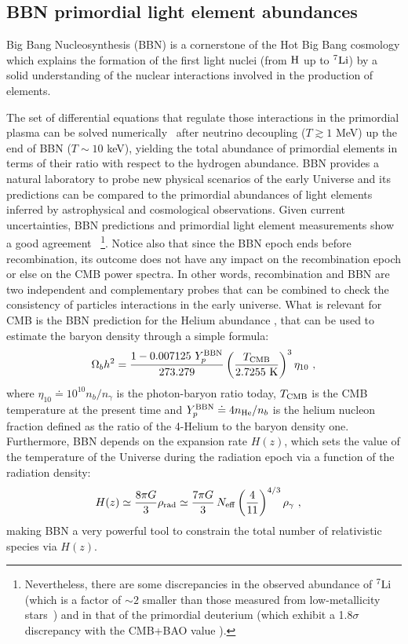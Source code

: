 \documentclass[fleqn,usenatbib,letters]{mnras}
\begin{document}
\subsection{BBN primordial light element abundances}

 Big Bang Nucleosynthesis (BBN) is a cornerstone of the Hot Big Bang cosmology which explains the formation of the first light nuclei (from $\rm H$ up to $^7\rm Li$) by a solid understanding of the nuclear interactions involved in the production of elements.

The set of differential equations that regulate those interactions in the primordial plasma can be solved numerically~\citep{PitrouEtal2018,Pisanti:2007hk,Consiglio:2017pot,Gariazzo:2021iiu} after neutrino decoupling ($T \gtrsim 1$ MeV) up the end of BBN ($T \sim 10$ keV), yielding the total abundance of primordial elements in terms of their ratio with respect to the hydrogen abundance. BBN provides a natural laboratory to probe new physical scenarios of the early Universe and its predictions can be compared to the primordial abundances of light elements inferred by astrophysical and cosmological observations. Given current uncertainties, BBN predictions and primordial light element measurements show a good agreement~\citep{Pitrou:2020etk,Mossa:2020gjc,Pisanti:2020efz} \footnote{Nevertheless, there are some discrepancies in the observed abundance of $^7\rm Li$ (which is a factor of $\sim 2$ smaller than those measured from low-metallicity stars~\citep{Fields:2011zzb,Cyburt:2008kw}) and in that  of the primordial deuterium (which exhibit a 1.8$\sigma$ discrepancy with the CMB+BAO value \citep{Pitrou:2020etk}).}. Notice also that since the BBN epoch ends before recombination, its outcome does not have any impact on the recombination epoch or else on the CMB power spectra. In other words, recombination and BBN are two independent and complementary probes that can be combined to check the consistency of particles interactions in the early universe.
What is relevant for CMB is the BBN prediction for the Helium abundance , that can be used to estimate the baryon density through a simple formula:
\begin{equation}
    \Omega_b h^2 = \frac{1 - 0.007125\ Y_p^{\rm BBN}}{273.279}\left(\frac{T_{\rm CMB}}{2.7255\ \mathrm{K}}\right)^3 \eta_{10}~, 
\end{equation}
where $\eta_{10} \doteq 10^{10}n_b/n_\gamma $ is the photon-baryon ratio today, $T_{\rm CMB} $ is the CMB temperature at the present time and $Y_p^{\rm BBN} \doteq 4 n_{\rm He}/n_{b}$ is the helium nucleon fraction defined as the ratio of the 4-Helium to the baryon density one.
Furthermore, BBN depends on the expansion rate $H(z)$, which sets the value of the temperature of the Universe during the radiation epoch via a function of the radiation density:
\begin{align}
&    H(z) \simeq \frac{8\pi G}{3}\rho_{\rm rad} \simeq \frac{7\pi G}{3} \,  N_{\rm eff} \left(\frac{4}{11}\right)^{4/3}\rho_\gamma~,
\end{align}
making BBN a very powerful tool to constrain the total number of relativistic species via $H(z)$. 
\end{document}
